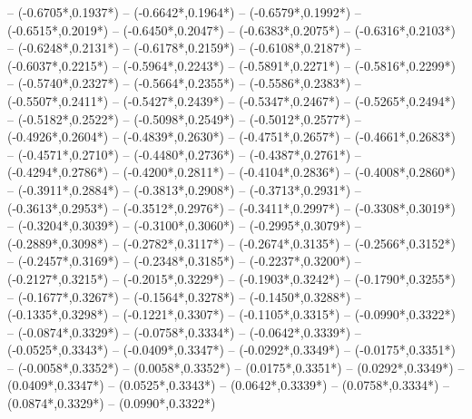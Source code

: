 {	-- ({-0.6705*\dx},{0.1937*\dy})
	-- ({-0.6642*\dx},{0.1964*\dy})
	-- ({-0.6579*\dx},{0.1992*\dy})
	-- ({-0.6515*\dx},{0.2019*\dy})
	-- ({-0.6450*\dx},{0.2047*\dy})
	-- ({-0.6383*\dx},{0.2075*\dy})
	-- ({-0.6316*\dx},{0.2103*\dy})
	-- ({-0.6248*\dx},{0.2131*\dy})
	-- ({-0.6178*\dx},{0.2159*\dy})
	-- ({-0.6108*\dx},{0.2187*\dy})
	-- ({-0.6037*\dx},{0.2215*\dy})
	-- ({-0.5964*\dx},{0.2243*\dy})
	-- ({-0.5891*\dx},{0.2271*\dy})
	-- ({-0.5816*\dx},{0.2299*\dy})
	-- ({-0.5740*\dx},{0.2327*\dy})
	-- ({-0.5664*\dx},{0.2355*\dy})
	-- ({-0.5586*\dx},{0.2383*\dy})
	-- ({-0.5507*\dx},{0.2411*\dy})
	-- ({-0.5427*\dx},{0.2439*\dy})
	-- ({-0.5347*\dx},{0.2467*\dy})
	-- ({-0.5265*\dx},{0.2494*\dy})
	-- ({-0.5182*\dx},{0.2522*\dy})
	-- ({-0.5098*\dx},{0.2549*\dy})
	-- ({-0.5012*\dx},{0.2577*\dy})
	-- ({-0.4926*\dx},{0.2604*\dy})
	-- ({-0.4839*\dx},{0.2630*\dy})
	-- ({-0.4751*\dx},{0.2657*\dy})
	-- ({-0.4661*\dx},{0.2683*\dy})
	-- ({-0.4571*\dx},{0.2710*\dy})
	-- ({-0.4480*\dx},{0.2736*\dy})
	-- ({-0.4387*\dx},{0.2761*\dy})
	-- ({-0.4294*\dx},{0.2786*\dy})
	-- ({-0.4200*\dx},{0.2811*\dy})
	-- ({-0.4104*\dx},{0.2836*\dy})
	-- ({-0.4008*\dx},{0.2860*\dy})
	-- ({-0.3911*\dx},{0.2884*\dy})
	-- ({-0.3813*\dx},{0.2908*\dy})
	-- ({-0.3713*\dx},{0.2931*\dy})
	-- ({-0.3613*\dx},{0.2953*\dy})
	-- ({-0.3512*\dx},{0.2976*\dy})
	-- ({-0.3411*\dx},{0.2997*\dy})
	-- ({-0.3308*\dx},{0.3019*\dy})
	-- ({-0.3204*\dx},{0.3039*\dy})
	-- ({-0.3100*\dx},{0.3060*\dy})
	-- ({-0.2995*\dx},{0.3079*\dy})
	-- ({-0.2889*\dx},{0.3098*\dy})
	-- ({-0.2782*\dx},{0.3117*\dy})
	-- ({-0.2674*\dx},{0.3135*\dy})
	-- ({-0.2566*\dx},{0.3152*\dy})
	-- ({-0.2457*\dx},{0.3169*\dy})
	-- ({-0.2348*\dx},{0.3185*\dy})
	-- ({-0.2237*\dx},{0.3200*\dy})
	-- ({-0.2127*\dx},{0.3215*\dy})
	-- ({-0.2015*\dx},{0.3229*\dy})
	-- ({-0.1903*\dx},{0.3242*\dy})
	-- ({-0.1790*\dx},{0.3255*\dy})
	-- ({-0.1677*\dx},{0.3267*\dy})
	-- ({-0.1564*\dx},{0.3278*\dy})
	-- ({-0.1450*\dx},{0.3288*\dy})
	-- ({-0.1335*\dx},{0.3298*\dy})
	-- ({-0.1221*\dx},{0.3307*\dy})
	-- ({-0.1105*\dx},{0.3315*\dy})
	-- ({-0.0990*\dx},{0.3322*\dy})
	-- ({-0.0874*\dx},{0.3329*\dy})
	-- ({-0.0758*\dx},{0.3334*\dy})
	-- ({-0.0642*\dx},{0.3339*\dy})
	-- ({-0.0525*\dx},{0.3343*\dy})
	-- ({-0.0409*\dx},{0.3347*\dy})
	-- ({-0.0292*\dx},{0.3349*\dy})
	-- ({-0.0175*\dx},{0.3351*\dy})
	-- ({-0.0058*\dx},{0.3352*\dy})
	-- ({0.0058*\dx},{0.3352*\dy})
	-- ({0.0175*\dx},{0.3351*\dy})
	-- ({0.0292*\dx},{0.3349*\dy})
	-- ({0.0409*\dx},{0.3347*\dy})
	-- ({0.0525*\dx},{0.3343*\dy})
	-- ({0.0642*\dx},{0.3339*\dy})
	-- ({0.0758*\dx},{0.3334*\dy})
	-- ({0.0874*\dx},{0.3329*\dy})
	-- ({0.0990*\dx},{0.3322*\dy})
}
